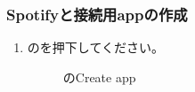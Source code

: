         \subsubsection{Spotifyと\bj 接続用appの作成}
        \label{sec:spotify4}
            \begin{enumerate}
                \item \spotifydashboard のを押下してください。
                \label{item:spotify6}
                    \begin{figure}[htbp]
                        \centering
                        \caption{\spotifydashboard のCreate app}
                        \label{img:spotify5}
                    \end{figure}


\end{enumerate}
